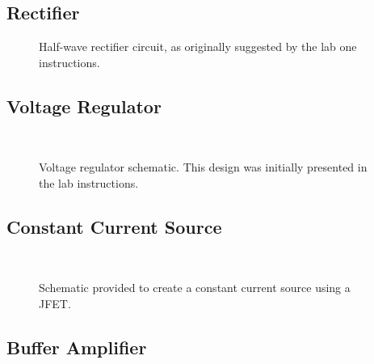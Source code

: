 \subsection{Rectifier}
\begin{figure}[H]
	\centering
	
	\parbox{3.5in}{
	\caption{Half-wave rectifier circuit, as originally suggested by the lab
	one instructions.}
	\label{fig:schem1}}
\end{figure}

\subsection{Voltage Regulator}
\begin{figure}[H]
	\centering
	\\
	\parbox{3.5in}{
	\caption{Voltage regulator schematic.  This design was initially presented
	in the lab instructions.}
	\label{fig:schem3}}
\end{figure}

\subsection{Constant Current Source}
\begin{figure}[H]
	\centering
	\\
	\parbox{3.5in}{
	\caption{Schematic provided to create a constant current source using a JFET.}
	\label{fig:schem4}}
\end{figure}

\subsection{Buffer Amplifier}
\begin{figure}[H]
	\centering
	
\end{figure}
